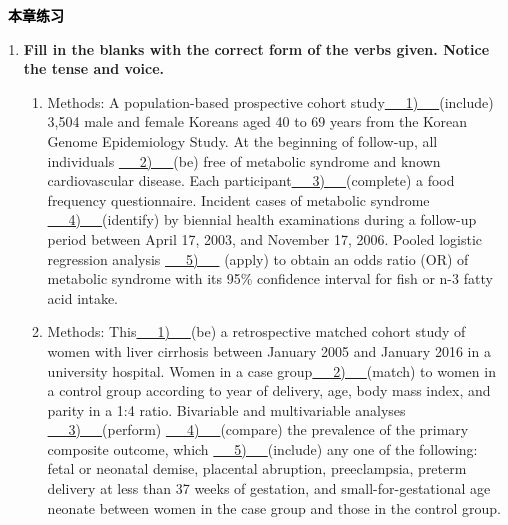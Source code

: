\documentclass[a4paper]{ctexbook}
\newenvironment{problemset}[1][本章练习]{
  \begin{center}
    \phantomsection\addcontentsline{toc}{section}{\texorpdfstring{本章练习}{Exercice}}
    \markright{#1}
    \textcolor{black}{\Large\bfseries\adftripleflourishleft~#1~\adftripleflourishright}
  \end{center}
  \begin{enumerate}}{
  \end{enumerate}}
\begin{document}
\begin{problemset}
  \textbf{Example 2}
  
  \hspace*{2em}Methods: 
  
  \hspace*{2em}\uline{\hspace*{3em}} Eighteen adults with first-ever chronic monohemispheric subcortical stroke participated in \uline{\hspace*{3em}} this randomized, controlled, triple-blinded trial. \uline{\hspace*{3em}} Intervention consisted of priming with real or sham iTBS to the ipsilesional primary motor cortex immediately before 45 minutes of upper limb physical therapy, daily for 10 days. \uline{\hspace*{3em}} Changes in upper limb function (Action Research Arm Test [ARAT]), upper limb impairment (Fugl-Meyer Scale), and corticomotor excitability, were assessed before, during, and immediately, 1 month and 3 months after the intervention. Functional magnetic resonance images were acquired before and at one month after the intervention.

  \item \textbf{Fill in the blanks with the correct form of the verbs given. Notice the tense and voice.}
  
  \begin{enumerate}
    \item Methods: A population-based prospective cohort study\uline{~~~1)~~~}(include) 3,504 male and female Koreans aged 40 to 69 years from the Korean Genome Epidemiology Study. At the beginning of follow-up, all individuals \uline{~~~2)~~~}(be) free of metabolic syndrome and known cardiovascular disease. Each participant\uline{~~~3)~~~}(complete) a food frequency questionnaire. Incident cases of metabolic syndrome \uline{~~~4)~~~}(identify) by biennial health examinations during a follow-up period between April 17, 2003, and November 17, 2006.
    Pooled logistic regression analysis \uline{~~~5)~~~} (apply) to obtain an odds ratio (OR) of metabolic syndrome with its 95\% confidence interval for fish or n-3 fatty acid intake.
    
    \item Methods: This\uline{~~~1)~~~}(be) a retrospective matched cohort study of women with liver cirrhosis between January 2005 and January 2016 in a university hospital. Women in a case group\uline{~~~2)~~~}(match) to women in a control group according to year of delivery, age, body mass index, and parity in a 1:4 ratio. Bivariable and multivariable analyses \uline{~~~3)~~~}(perform) \uline{~~~4)~~~}(compare) the prevalence of the primary composite outcome, which \uline{~~~5)~~~}(include) any one of the following: fetal or neonatal demise, placental abruption, preeclampsia, preterm delivery at less than 37 weeks of gestation, and small-for-gestational age neonate between women in the case group and those in the control group.
    

\end{enumerate}
\end{problemset}
\end{document}
